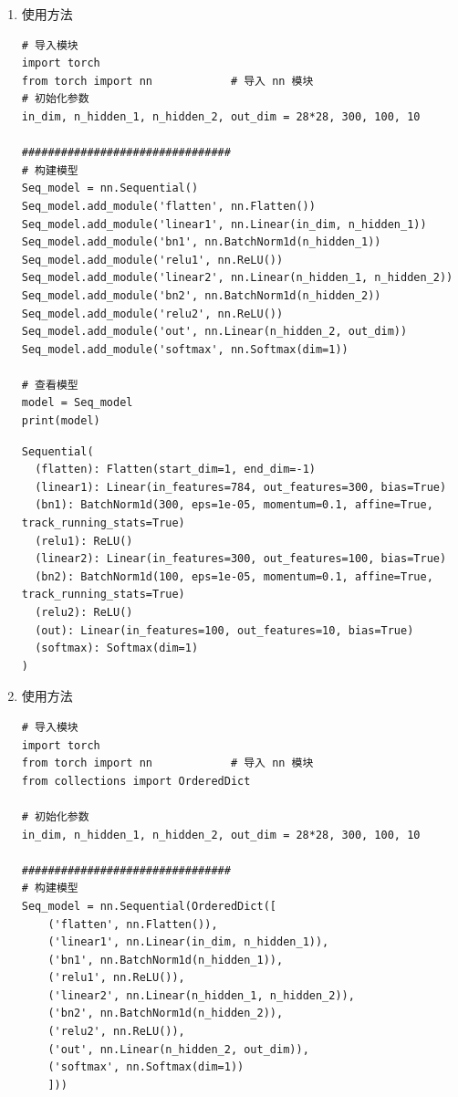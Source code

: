 \begin{enumerate}[label=\arabic*)]
    \item 使用方法
\begin{lstlisting}[style=pythonstyle]
# 导入模块
import torch
from torch import nn            # 导入 nn 模块
# 初始化参数
in_dim, n_hidden_1, n_hidden_2, out_dim = 28*28, 300, 100, 10

################################
# 构建模型
Seq_model = nn.Sequential()
Seq_model.add_module('flatten', nn.Flatten())
Seq_model.add_module('linear1', nn.Linear(in_dim, n_hidden_1))
Seq_model.add_module('bn1', nn.BatchNorm1d(n_hidden_1))
Seq_model.add_module('relu1', nn.ReLU())
Seq_model.add_module('linear2', nn.Linear(n_hidden_1, n_hidden_2))
Seq_model.add_module('bn2', nn.BatchNorm1d(n_hidden_2))
Seq_model.add_module('relu2', nn.ReLU())
Seq_model.add_module('out', nn.Linear(n_hidden_2, out_dim))
Seq_model.add_module('softmax', nn.Softmax(dim=1))

# 查看模型
model = Seq_model
print(model)
\end{lstlisting}
\begin{lstlisting}[style=demostyle,numbers=none]
Sequential(
  (flatten): Flatten(start_dim=1, end_dim=-1)
  (linear1): Linear(in_features=784, out_features=300, bias=True)
  (bn1): BatchNorm1d(300, eps=1e-05, momentum=0.1, affine=True, track_running_stats=True)
  (relu1): ReLU()
  (linear2): Linear(in_features=300, out_features=100, bias=True)
  (bn2): BatchNorm1d(100, eps=1e-05, momentum=0.1, affine=True, track_running_stats=True)
  (relu2): ReLU()
  (out): Linear(in_features=100, out_features=10, bias=True)
  (softmax): Softmax(dim=1)
)
\end{lstlisting}

    \item 使用方法
\begin{lstlisting}[style=pythonstyle]
# 导入模块
import torch
from torch import nn            # 导入 nn 模块
from collections import OrderedDict

# 初始化参数
in_dim, n_hidden_1, n_hidden_2, out_dim = 28*28, 300, 100, 10

################################
# 构建模型
Seq_model = nn.Sequential(OrderedDict([
    ('flatten', nn.Flatten()),
    ('linear1', nn.Linear(in_dim, n_hidden_1)),
    ('bn1', nn.BatchNorm1d(n_hidden_1)),
    ('relu1', nn.ReLU()),
    ('linear2', nn.Linear(n_hidden_1, n_hidden_2)),
    ('bn2', nn.BatchNorm1d(n_hidden_2)),
    ('relu2', nn.ReLU()),
    ('out', nn.Linear(n_hidden_2, out_dim)),
    ('softmax', nn.Softmax(dim=1))
    ]))


\end{lstlisting}
\end{enumerate}
